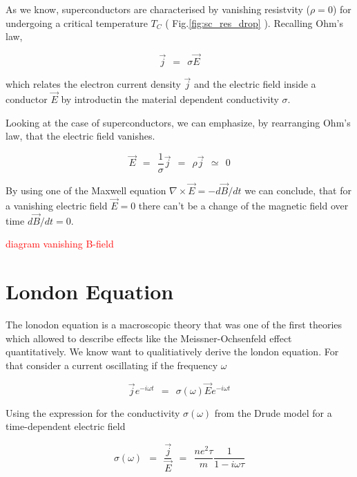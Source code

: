\documentclass[10pt]{report}
\numberwithin{equation}{chapter}
\newcommand{\myRef}[1]{
  Fig.\ref{#1}
}
\begin{document}
As we know, superconductors are characterised by vanishing resistvity ($\rho=0$) for undergoing a critical temperature $T_C$ (\myRef{fig:sc_res_drop}).
Recalling Ohm's law, 

\begin{equation} \label{eq:ohms_law}
  \vec{j} ~~=~~ \sigma \vec{E}
\end{equation}


which relates the electron current density $\vec{j}$ and the electric field inside a conductor $\vec{E}$ by introductin the material dependent conductivity $\sigma$.

Looking at the case of superconductors, we can emphasize, by rearranging Ohm's law, that the electric field vanishes.

\begin{equation}
  \vec{E} ~~=~~ \frac{1}{\sigma} \vec{j} ~~=~~ \rho \vec{j} ~~≃~~ 0
\end{equation}

By using one of the Maxwell equation $\nabla \times \vec{E} = - d\vec{B}/ dt$ we can conclude, that for a vanishing electric field $\vec{E} = 0$ there can't be a change of the magnetic field over time $d\vec{B}/dt=0$.


\textcolor{red}{diagram vanishing B-field}


\section{London Equation}

The lonodon equation is a macroscopic theory that was one of the first theories which allowed to describe effects like the Meissner-Ochsenfeld effect quantitatively.
We know want to qualitiatively derive the london equation. For that consider a current oscillating if the frequency $\omega$

\begin{equation}\label{eq:osc_curr}
  \vec{j} e^{-i \omega t} ~~=~~ \sigma(\omega) \vec{E} e^{-i \omega t}
\end{equation}

Using the expression for the conductivity $\sigma(\omega)$ from the Drude model for a time-dependent electric field

\begin{equation}
  \sigma(\omega) ~~=~~ \frac{\vec{j}}{\vec{E}} ~~=~~ \frac{ne^2 \tau}{m} \frac{1}{1-i\omega \tau}
\end{equation}

%
\end{document}
